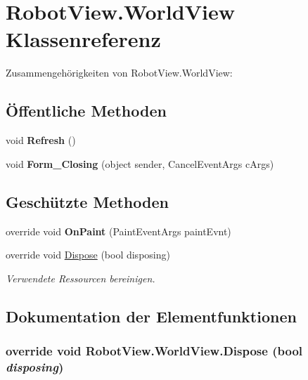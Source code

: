 \hypertarget{class_robot_view_1_1_world_view}{
\section{RobotView.WorldView Klassenreferenz}
\label{class_robot_view_1_1_world_view}
}


Zusammengehörigkeiten von RobotView.WorldView:\subsection*{Öffentliche Methoden}
\begin{DoxyCompactItemize}
\item 
\hypertarget{class_robot_view_1_1_world_view_a8b50c86f7991f081d0530e272e296623}{
void {\bfseries Refresh} ()}
\label{class_robot_view_1_1_world_view_a8b50c86f7991f081d0530e272e296623}

\item 
\hypertarget{class_robot_view_1_1_world_view_ada058516565c5905b624a62f42e81d00}{
void {\bfseries Form\_\-Closing} (object sender, CancelEventArgs cArgs)}
\label{class_robot_view_1_1_world_view_ada058516565c5905b624a62f42e81d00}

\end{DoxyCompactItemize}
\subsection*{Geschützte Methoden}
\begin{DoxyCompactItemize}
\item 
\hypertarget{class_robot_view_1_1_world_view_ad50b0a0a0c4bdc7e027eb536db6bba35}{
override void {\bfseries OnPaint} (PaintEventArgs paintEvnt)}
\label{class_robot_view_1_1_world_view_ad50b0a0a0c4bdc7e027eb536db6bba35}

\item 
override void \hyperlink{class_robot_view_1_1_world_view_ae412a0d88561b075a22955c6e0b41aca}{Dispose} (bool disposing)
\begin{DoxyCompactList}\small\item\em Verwendete Ressourcen bereinigen. \item\end{DoxyCompactList}\end{DoxyCompactItemize}


\subsection{Dokumentation der Elementfunktionen}
\hypertarget{class_robot_view_1_1_world_view_ae412a0d88561b075a22955c6e0b41aca}{
\subsubsection[{Dispose}]{\setlength{\rightskip}{0pt plus 5cm}override void RobotView.WorldView.Dispose (bool {\em disposing})}}
\label{class_robot_view_1_1_world_view_ae412a0d88561b075a22955c6e0b41aca}


